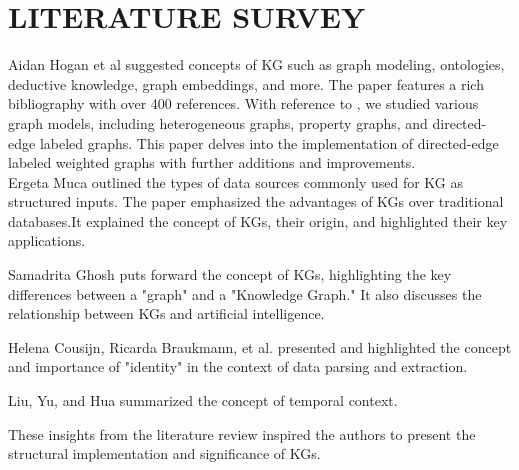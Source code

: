 \documentclass[conference]{IEEEtran}
\begin{document}
\section{LITERATURE SURVEY}

Aidan Hogan et al\cite{b8} suggested concepts of KG such as graph modeling, ontologies, deductive knowledge, graph embeddings, and more. The paper features a rich bibliography with over 400 references.
With reference to \cite{b8}, we studied various graph models, including heterogeneous graphs\cite{b18}, property graphs\cite{b12}, and directed-edge labeled graphs\cite{b8}. This paper delves into the implementation of directed-edge labeled weighted graphs with further additions and improvements.
\\
Ergeta Muca\cite{b7} outlined the types of data sources commonly used for KG as structured inputs. The paper emphasized the advantages of KGs over traditional databases.It explained the concept of KGs, their origin, and highlighted their key applications.

Samadrita Ghosh \cite{b1} puts forward the concept of KGs, highlighting the key differences between a "graph" and a "Knowledge Graph." It also discusses the relationship between KGs and artificial intelligence.

Helena Cousijn, Ricarda Braukmann, et al. \cite{b16} presented and highlighted the concept and importance of "identity" in the context of data parsing and extraction.

Liu, Yu, and Hua \cite{b17} summarized the concept of temporal context.

These insights from the literature review inspired the authors to present the structural implementation and significance of KGs.
\end{document}

